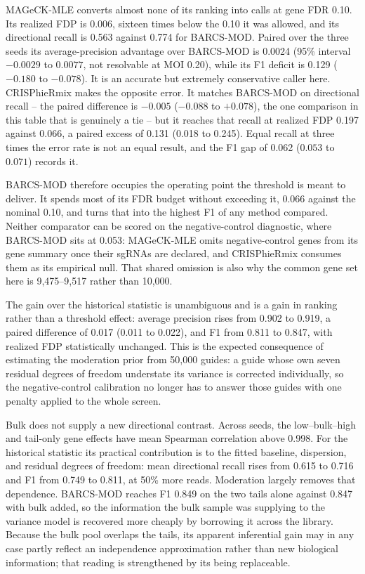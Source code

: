 MAGeCK-MLE converts almost none of its ranking into calls at gene FDR 0.10.
Its realized FDP is 0.006, sixteen times below the 0.10 it was allowed, and
its directional recall is 0.563 against 0.774 for BARCS-MOD.  Paired over the
three seeds its average-precision advantage over BARCS-MOD is 0.0024 (95\%
interval $-0.0029$ to $0.0077$, not resolvable at MOI 0.20), while its F1
deficit is 0.129 ($-0.180$ to $-0.078$).  It is an accurate but extremely
conservative caller here.  CRISPhieRmix makes the opposite error.  It matches
BARCS-MOD on directional recall -- the paired difference is $-0.005$
($-0.088$ to $+0.078$), the one comparison in this table that is genuinely a
tie -- but it reaches that recall at realized FDP 0.197 against 0.066, a
paired excess of 0.131 (0.018 to 0.245).  Equal recall at three times the
error rate is not an equal result, and the F1 gap of 0.062 ($0.053$ to
$0.071$) records it.

BARCS-MOD therefore occupies the operating point the threshold is meant to
deliver.  It spends most of its FDR budget without exceeding it, 0.066
against the nominal 0.10, and turns that into the highest F1 of any method
compared.  Neither comparator can be scored on the negative-control
diagnostic, where BARCS-MOD sits at 0.053: MAGeCK-MLE omits negative-control
genes from its gene summary once their sgRNAs are declared, and CRISPhieRmix
consumes them as its empirical null.  That shared omission is also why the
common gene set here is 9,475--9,517 rather than 10,000.

The gain over the historical statistic is unambiguous and is a gain in
ranking rather than a threshold effect: average precision rises from 0.902 to
0.919, a paired difference of 0.017 (0.011 to 0.022), and F1 from 0.811 to
0.847, with realized FDP statistically unchanged.  This is the expected
consequence of estimating the moderation prior from 50,000 guides: a guide
whose own seven residual degrees of freedom understate its variance is
corrected individually, so the negative-control calibration no longer has to
answer those guides with one penalty applied to the whole screen.

Bulk does not supply a new directional contrast.  Across seeds, the
low--bulk--high and tail-only gene effects have mean Spearman correlation
above 0.998.  For the historical statistic its practical contribution is to
the fitted baseline, dispersion, and residual degrees of freedom: mean
directional recall rises from 0.615 to 0.716 and F1 from 0.749 to 0.811, at
50\% more reads.  Moderation largely removes that dependence.  BARCS-MOD
reaches F1 0.849 on the two tails alone against 0.847 with bulk added, so the
information the bulk sample was supplying to the variance model is recovered
more cheaply by borrowing it across the library.  Because the bulk pool
overlaps the tails, its apparent inferential gain may in any case partly
reflect an independence approximation rather than new biological information;
that reading is strengthened by its being replaceable.

